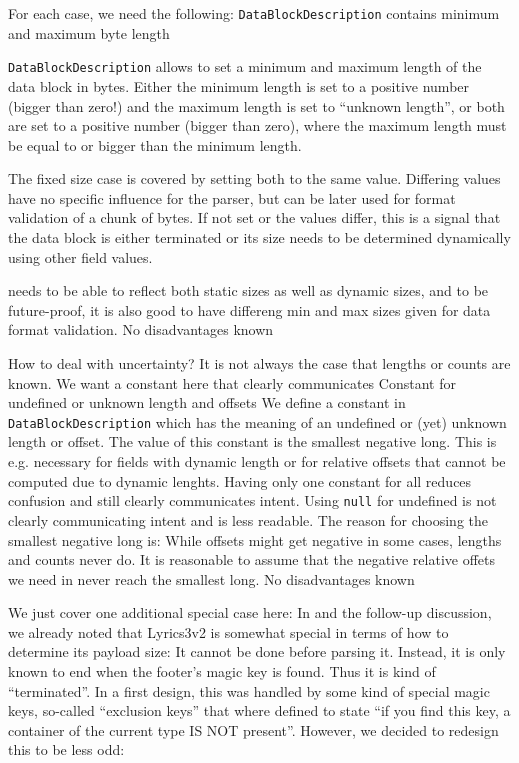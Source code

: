 For each case, we need the following:
{%
\texttt{DataBlockDescription} contains minimum and maximum byte length
}
{%
\texttt{DataBlockDescription} allows to set a minimum and maximum length of the data block in bytes. Either the minimum length is set to a positive number (bigger than zero!) and the maximum length is set to ``unknown length'', or both are set to a positive number (bigger than zero), where the maximum length must be equal to or bigger than the minimum length.

The fixed size case is covered by setting both to the same value. Differing values have no specific influence for the parser, but can be later used for format validation of a chunk of bytes. If not set or the values differ, this is a signal that the data block is either terminated or its size needs to be determined dynamically using other field values.
}
{%
\LibName{} needs to be able to reflect both static sizes as well as dynamic sizes, and to be future-proof, it is also good to have differeng min and max sizes given for data format validation.
}
{%
No disadvantages known
}

How to deal with uncertainty? It is not always the case that lengths or counts are known. We want a constant here that clearly communicates
{%
Constant for undefined or unknown length and offsets
}
{%
We define a constant in \texttt{DataBlockDescription} which has the meaning of an undefined or (yet) unknown length or offset. The value of this constant is the smallest negative long.
}
{%
This is e.g. necessary for fields with dynamic length or for relative offsets that cannot be computed due to dynamic lenghts. Having only one constant for all reduces confusion and still clearly communicates intent. Using \texttt{null} for undefined is not clearly communicating intent and is less readable. The reason for choosing the smallest negative long is: While offsets might get negative in some cases, lengths and counts never do. It is reasonable to assume that the negative relative offets we need in \COMPdataFormatManagement{} never reach the smallest long.
}
{%
No disadvantages known
}


We just cover one additional special case here: In  and the follow-up discussion, we already noted that Lyrics3v2 is somewhat special in terms of how to determine its payload size: It cannot be done before parsing it. Instead, it is only known to end when the footer's magic key is found. Thus it is kind of ``terminated''. In a first design, this was handled by some kind of special magic keys, so-called ``exclusion keys'' that where defined to state ``if you find this key, a container of the current type IS NOT present''. However, we decided to redesign this to be less odd:

